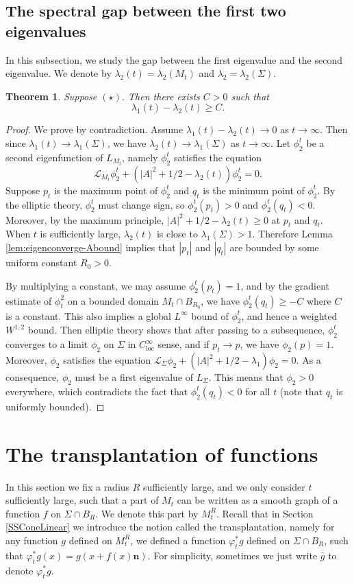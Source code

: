 \documentclass[12pt]{amsart}
\numberwithin{equation}{section}
\newtheorem{theorem}{Theorem}[section]
\numberwithin{equation}{section}
\newcommand{\bn}{\mathbf{n}}
\newcommand{\cL}{\mathcal{L}}
\DeclareMathOperator{\loc}{loc}
\begin{document}
	\subsection{The spectral gap between the first two eigenvalues}\label{SSSpectralGap}
	In this subsection, we study the gap between the first eigenvalue and the second eigenvalue. We denote by $\lambda_2(t)=\lambda_2(M_t)$ and $\lambda_2=\lambda_2(\Sigma)$.
	\begin{theorem}
		Suppose $(\star)$. Then there exists $C>0$ such that $$\lambda_1(t)-\lambda_2(t)\geq C.$$
	\end{theorem} 
	
	\begin{proof}
		We prove by contradiction. Assume $\lambda_1(t)-\lambda_2(t)\to 0$ as $t\to\infty$. Then since $\lambda_1(t)\to\lambda_1(\Sigma)$, we have $\lambda_2(t)\to\lambda_1(\Sigma)$ as $t\to\infty$. Let $\phi_2^t$ be a second eigenfunction of $L_{M_t}$, namely 
		$\phi_2^t$ satisfies the equation
		\[\cL_{M_t}\phi_2^t+(|A|^2+1/2-\lambda_2(t))\phi_2^t=0.\]
		Suppose $p_t$ is the maximum point of $\phi_2^t$ and $q_t$ is the minimum point of $\phi_2^t$. By the elliptic theory, $\phi_2^t$ must change sign, so $\phi_2^t(p_t)>0$ and $\phi_2^t(q_t)<0$. Moreover, by the maximum principle, $|A|^2+1/2-\lambda_2(t)\geq 0$ at $p_t$ and $q_t$. When $t$ is sufficiently large, $\lambda_2(t)$ is close to $\lambda_1(\Sigma)>1$. Therefore Lemma \ref{lem:eigenconverge-Abound} implies that $|p_t|$ and $|q_t|$ are bounded by some uniform constant $R_0>0$.
		
		By multiplying a constant, we may assume $\phi^t_2(p_t)=1$, and by the gradient estimate of $\phi^2_t$ on a bounded domain $M_t\cap B_{R_0}$, we have $\phi^t_2(q_t)\geq -C$ where $C$ is a constant. This also implies a global $L^\infty$ bound of $\phi^t_2$, and hence a weighted $W^{1,2}$ bound. Then elliptic theory shows that after passing to a subsequence, $\phi^t_2$ converges to a limit $\phi_2$ on $\Sigma$ in $C_{\loc}^{\infty}$ sense, and if $p_t\to p$, we have $\phi_2(p)=1$. Moreover, $\phi_2$ satisfies the equation
		$\cL_{\Sigma}\phi_2+(|A|^2+1/2-\lambda_1)\phi_2=0.$
		As a consequence, $\phi_2$ must be a first eigenvalue of $L_{\Sigma}$. This means that $\phi_2>0$ everywhere, which contradicts the fact that $\phi^t_2(q_t)<0$ for all $t$ (note that $q_t$ is uniformly bounded).
	\end{proof}
	
	
	\appendix
	
	\section{The transplantation of functions}\label{SS:transplantation}
	In this section we fix a radius $R$ sufficiently large, and we only consider $t$ sufficiently large, such that a part of $M_t$ can be written as a smooth graph of a function $f$ on $\Sigma\cap B_R$. We denote this part by $M_t^R$. Recall that in Section \ref{SSConeLinear} we introduce the notion called the transplantation, namely for any function $g$ defined on $M_t^R$, we defined a function $\varphi_t^* g$ defined on $\Sigma\cap B_R$, such that 
	$ \varphi_t^*g(x)= g(x+f(x)\bn).$
	For simplicity, sometimes we just write $\bar{g}$ to denote $\varphi^*_t g$.
	
\end{document}
